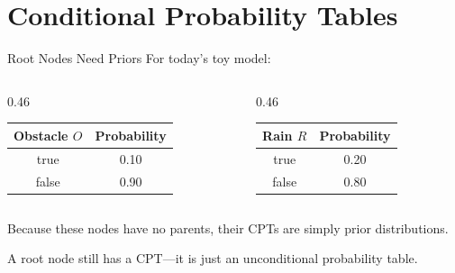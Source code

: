 \documentclass[aspectratio=169,10pt]{beamer}
\begin{document}
\section{Conditional Probability Tables}

\begin{frame}[shrink=10]{Root Nodes Need Priors}
  For today's toy model:

  \begin{columns}[T,onlytextwidth]
    \begin{column}{0.46\textwidth}
      \begin{center}
      \begin{tabular}{c|c}
        \textbf{Obstacle $O$} & \textbf{Probability} \\\hline
        true & 0.10 \\
        false & 0.90
      \end{tabular}
      \end{center}
    \end{column}
    \begin{column}{0.46\textwidth}
      \begin{center}
      \begin{tabular}{c|c}
        \textbf{Rain $R$} & \textbf{Probability} \\\hline
        true & 0.20 \\
        false & 0.80
      \end{tabular}
      \end{center}
    \end{column}
  \end{columns}

  Because these nodes have no parents, their CPTs are simply prior distributions.

  \begin{keyidea}
    A root node still has a CPT---it is just an unconditional probability table.
  \end{keyidea}
\end{frame}
\end{document}
